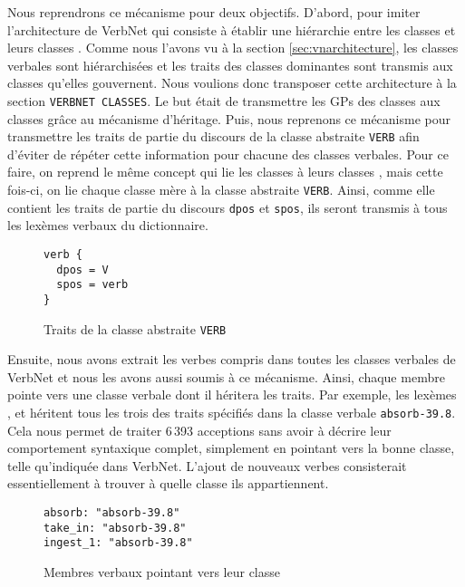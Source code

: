 Nous reprendrons ce mécanisme pour deux objectifs. D'abord, pour imiter l'architecture de VerbNet qui consiste à établir une hiérarchie entre les classes  et leurs classes . Comme nous l'avons vu à la section \ref{sec:vnarchitecture}, les classes verbales sont hiérarchisées et les traits des classes dominantes sont transmis aux classes qu'elles gouvernent. Nous voulions donc transposer cette architecture à la section \texttt{VERBNET CLASSES}. Le but était de transmettre les \acp{GP} des classes  aux classes  grâce au mécanisme d'héritage. Puis, nous reprenons ce mécanisme pour transmettre les traits de partie du discours de la classe abstraite \texttt{VERB} afin d'éviter de répéter cette information pour chacune des classes verbales. Pour ce faire, on reprend le même concept qui lie les classes  à leurs classes , mais cette fois-ci, on lie chaque classe mère à la classe abstraite \texttt{VERB}. Ainsi, comme elle contient les traits de partie du discours \texttt{dpos} et \texttt{spos}, ils seront transmis à tous les lexèmes verbaux du dictionnaire.

\begin{figure}[htb]
  \caption{Traits de la classe abstraite \texttt{VERB}}
\begin{lstlisting}[language=mate]
verb {
  dpos = V
  spos = verb
}
\end{lstlisting}
\end{figure}

Ensuite, nous avons extrait les verbes compris dans toutes les classes verbales de VerbNet et nous les avons aussi soumis à ce mécanisme. Ainsi, chaque membre pointe vers une classe verbale dont il héritera les traits. Par exemple, les lexèmes ,  et  héritent tous les trois des traits spécifiés dans la classe verbale \texttt{absorb-39.8}. Cela nous permet de traiter 6\,393 acceptions sans avoir à décrire leur comportement syntaxique complet, simplement en pointant vers la bonne classe, telle qu'indiquée dans VerbNet. L'ajout de nouveaux verbes consisterait essentiellement à trouver à quelle classe ils appartiennent.

\begin{figure}[htb]
  \caption{Membres verbaux pointant vers leur classe}
\begin{lstlisting}[language=mate]
absorb: "absorb-39.8"
take_in: "absorb-39.8"
ingest_1: "absorb-39.8"
\end{lstlisting}
\end{figure}

